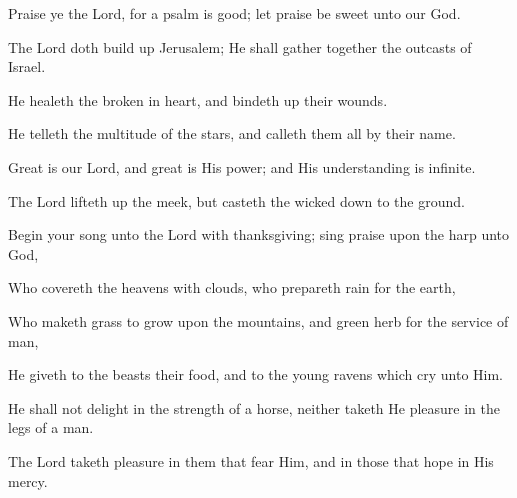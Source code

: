 Praise ye the Lord, for a psalm is good; let praise be sweet unto our God.

The Lord doth build up Jerusalem; He shall gather together the outcasts of Israel.

He healeth the broken in heart, and bindeth up their wounds.

He telleth the multitude of the stars, and calleth them all by their name.

Great is our Lord, and great is His power; and His understanding is infinite.

The Lord lifteth up the meek, but casteth the wicked down to the ground.

Begin your song unto the Lord with thanksgiving; sing praise upon the harp unto God,

Who covereth the heavens with clouds, who prepareth rain for the earth,

Who maketh grass to grow upon the mountains, and green herb for the service of man,

He giveth to the beasts their food, and to the young ravens which cry unto Him.

He shall not delight in the strength of a horse, neither taketh He pleasure in the legs of a man.

The Lord taketh pleasure in them that fear Him, and in those that hope in His mercy.

